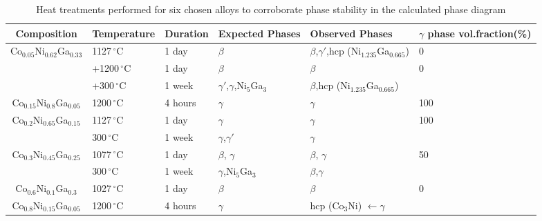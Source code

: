 \documentclass[article]{elsarticle}
\begin{document}
\pagebreak
\newpage{}
%
\begin{table}
\caption{Heat treatments performed for six chosen alloys to corroborate
phase stability in the calculated phase diagram}
{\small
\begin{tabular}{|c|p{1.8cm}|p{1.3cm}|p{1.8cm}|p{3.5cm}|p{2.4cm}|}
\hline
Composition & Temperature & Duration & Expected Phases & Observed Phases & $\gamma$ phase vol.fraction(\%) \\ \hline
Co$_{0.05}$Ni$_{0.62}$Ga$_{0.33}$ & 1127$\,^{\circ}\mathrm{C}$ & 1 day & $\beta$ & $\beta$,$\gamma'$,hcp (Ni$_{1.235}$Ga$_{0.665}$) & 0 \tabularnewline
& +1200$\,^{\circ}\mathrm{C}$ & 1 day & $\beta$ & $\beta$ & 0\tabularnewline
& +300$\,^{\circ}\mathrm{C}$ & 1 week & $\gamma'$,$\gamma$,Ni$_5$Ga$_3$ & $\beta$,hcp (Ni$_{1.235}$Ga$_{0.665}$) & \tabularnewline
Co$_{0.15}$Ni$_{0.8}$Ga$_{0.05}$ & 1200$\,^{\circ}\mathrm{C}$ & 4 hours & $\gamma$ & $\gamma$ & 100 \tabularnewline
Co$_{0.2}$Ni$_{0.65}$Ga$_{0.15}$ & 1127$\,^{\circ}\mathrm{C}$ & 1 day & $\gamma$ & $\gamma$ & 100 \tabularnewline
& 300$\,^{\circ}\mathrm{C}$ & 1 week & $\gamma$,$\gamma'$ & $\gamma$ & \tabularnewline
Co$_{0.3}$Ni$_{0.45}$Ga$_{0.25}$ & 1077$\,^{\circ}\mathrm{C}$ & 1 day & $\beta$, $\gamma$ & $\beta$, $\gamma$ & 50 \tabularnewline
& 300$\,^{\circ}\mathrm{C}$ & 1 week & $\gamma$,Ni$_5$Ga$_3$ & $\beta$,$\gamma$ & \tabularnewline
Co$_{0.6}$Ni$_{0.1}$Ga$_{0.3}$ & 1027$\,^{\circ}\mathrm{C}$ & 1 day & $\beta$ & $\beta$ & 0 \tabularnewline
Co$_{0.8}$Ni$_{0.15}$Ga$_{0.05}$ 
& 1200$\,^{\circ}\mathrm{C}$ & 4 hours & $\gamma$ & hcp (Co$_3$Ni) $\leftarrow \gamma$ & \tabularnewline
\hline
\end{tabular}}
\label{Exp-1}
\end{table}
\end{document}
